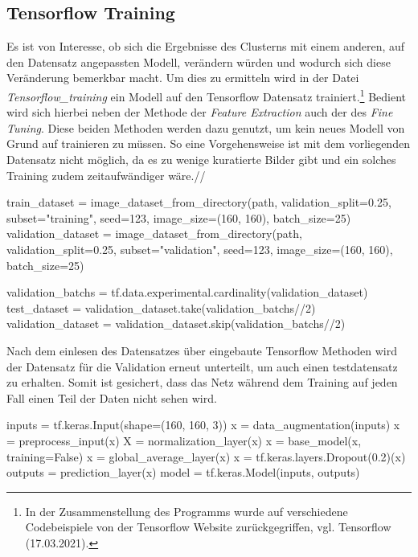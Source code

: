 \documentclass[a4paper,12pt,ngerman]{article}
\begin{document}
\subsection{Tensorflow Training}

Es ist von Interesse, ob sich die Ergebnisse des Clusterns mit einem anderen, auf den Datensatz angepassten Modell, verändern würden und wodurch sich diese Veränderung bemerkbar macht. Um dies zu ermitteln wird in der Datei \textit{Tensorflow\_training} ein Modell auf den Tensorflow Datensatz trainiert.\footnote{In der Zusammenstellung des Programms wurde auf verschiedene Codebeispiele von der Tensorflow Website zurückgegriffen, vgl. Tensorflow (17.03.2021).} Bedient wird sich hierbei neben der Methode der \textit{Feature Extraction} auch der des \textit{Fine Tuning}. Diese beiden Methoden werden dazu genutzt, um kein neues Modell von Grund auf trainieren zu müssen. So eine Vorgehensweise ist mit dem vorliegenden Datensatz nicht möglich, da es zu wenige kuratierte Bilder gibt und ein solches Training zudem zeitaufwändiger wäre.//

\begin{python}
	train_dataset = image_dataset_from_directory(path, validation_split=0.25, subset="training", seed=123, image_size=(160, 160), batch_size=25)
	validation_dataset = image_dataset_from_directory(path, validation_split=0.25, subset="validation", seed=123, image_size=(160, 160), batch_size=25)

	validation_batchs = tf.data.experimental.cardinality(validation_dataset)
	test_dataset = validation_dataset.take(validation_batchs//2)
	validation_dataset = validation_dataset.skip(validation_batchs//2)
\end{python}

Nach dem einlesen des Datensatzes über eingebaute Tensorflow Methoden wird der Datensatz für die Validation erneut unterteilt, um auch einen testdatensatz zu erhalten. Somit ist gesichert, dass das Netz während dem Training auf jeden Fall einen Teil der Daten nicht sehen wird. \\

\begin{python}
	inputs = tf.keras.Input(shape=(160, 160, 3))
	x = data_augmentation(inputs)
	x = preprocess_input(x)
	X = normalization_layer(x)
	x = base_model(x, training=False)
	x = global_average_layer(x)
	x = tf.keras.layers.Dropout(0.2)(x)
	outputs = prediction_layer(x)
	model = tf.keras.Model(inputs, outputs)
\end{python}
\end{document}
